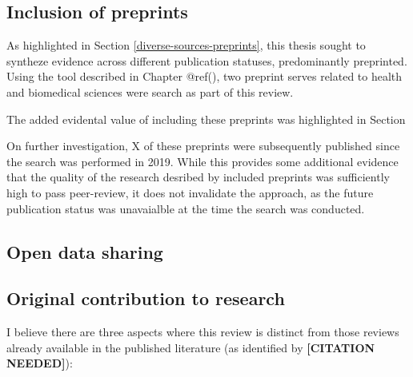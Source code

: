 \documentclass[a4paper, twoside]{templates/ociamthesis}
\begin{document}
\hypertarget{inclusion-of-preprints}{%
\subsection{Inclusion of preprints}\label{inclusion-of-preprints}}

As highlighted in Section \ref{diverse-sources-preprints}, this thesis sought to syntheze evidence across different publication statuses, predominantly preprinted. Using the tool described in Chapter @ref(), two preprint serves related to health and biomedical sciences were search as part of this review.

The added evidental value of including these preprints was highlighted in Section

On further investigation, X of these preprints were subsequently published since the search was performed in 2019. While this provides some additional evidence that the quality of the research desribed by included preprints was sufficiently high to pass peer-review, it does not invalidate the approach, as the future publication status was unavaialble at the time the search was conducted.

\hypertarget{sys-rev-open-data}{%
\subsection{Open data sharing}\label{sys-rev-open-data}}

\hypertarget{original-contribution-to-research}{%
\subsection{Original contribution to research}\label{original-contribution-to-research}}

I believe there are three aspects where this review is distinct from those reviews already available in the published literature (as identified by \textbf{{[}CITATION NEEDED{]}}):
\end{document}

